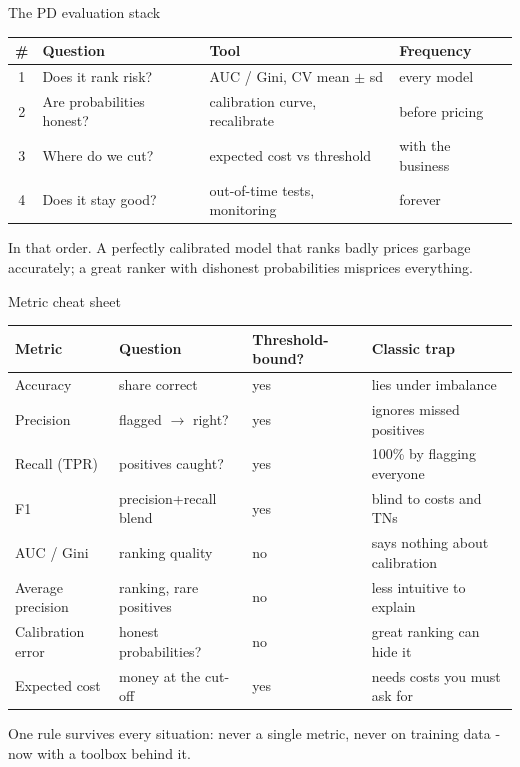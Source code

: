 \documentclass[10pt,aspectratio=169]{beamer}
\begin{document}
\begin{frame}{The PD evaluation stack}
  \small
  \begin{center}
  \begin{tabular}{@{}clll@{}}
    \toprule
    \# & Question & Tool & Frequency \\
    \midrule
    1 & Does it rank risk? & AUC / Gini, CV mean $\pm$ sd & every model \\
    2 & Are probabilities honest? & calibration curve, recalibrate & before pricing \\
    3 & Where do we cut? & expected cost vs threshold & with the business \\
    4 & Does it stay good? & out-of-time tests, monitoring & forever \\
    \bottomrule
  \end{tabular}
  \end{center}
  \vspace{0.6em}
  \begin{center}
    In that order. A perfectly calibrated model that ranks badly prices
    garbage accurately; a great ranker with dishonest probabilities
    misprices everything.
  \end{center}
\end{frame}

\begin{frame}{Metric cheat sheet}
  \footnotesize
  \begin{center}
  \begin{tabular}{@{}llll@{}}
    \toprule
    Metric & Question & Threshold-bound? & Classic trap \\
    \midrule
    Accuracy & share correct & yes & lies under imbalance \\
    Precision & flagged $\to$ right? & yes & ignores missed positives \\
    Recall (TPR) & positives caught? & yes & 100\% by flagging everyone \\
    F1 & precision+recall blend & yes & blind to costs and TNs \\
    AUC / Gini & ranking quality & no & says nothing about calibration \\
    Average precision & ranking, rare positives & no & less intuitive to explain \\
    Calibration error & honest probabilities? & no & great ranking can hide it \\
    Expected cost & money at the cut-off & yes & needs costs you must ask for \\
    \bottomrule
  \end{tabular}
  \end{center}
  \vspace{0.4em}
  \begin{center}\small
    One rule survives every situation: \alert{never a single metric, never
    on training data} - now with a toolbox behind it.
  \end{center}
\end{frame}
\end{document}

